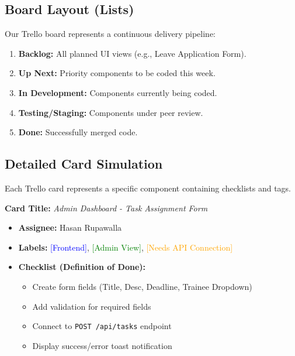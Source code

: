 \documentclass[12pt,a4paper]{article}
\begin{document}
\subsection{Board Layout (Lists)}
Our Trello board represents a continuous delivery pipeline:
\begin{enumerate}
    \item \textbf{Backlog:} All planned UI views (e.g., Leave Application Form).
    \item \textbf{Up Next:} Priority components to be coded this week.
    \item \textbf{In Development:} Components currently being coded.
    \item \textbf{Testing/Staging:} Components under peer review.
    \item \textbf{Done:} Successfully merged code.
\end{enumerate}

\subsection{Detailed Card Simulation}
Each Trello card represents a specific component containing checklists and tags.

\textbf{Card Title:} \textit{Admin Dashboard - Task Assignment Form}
\begin{itemize}[noitemsep]
    \item \textbf{Assignee:} Hasan Rupawalla
    \item \textbf{Labels:} \textcolor{blue}{[Frontend]}, \textcolor{green}{[Admin View]}, \textcolor{orange}{[Needs API Connection]}
    \item \textbf{Checklist (Definition of Done):}
    \begin{itemize}[label=$\square$]
        \item Create form fields (Title, Desc, Deadline, Trainee Dropdown)
        \item Add validation for required fields
        \item Connect to \texttt{POST /api/tasks} endpoint
        \item Display success/error toast notification
    \end{itemize}
\end{itemize}

\vspace{1cm}
\begin{center}
\end{center}
\vspace{1cm}
\end{document}
